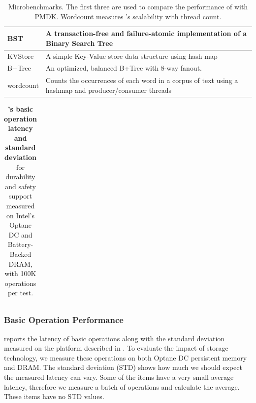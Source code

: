 \begin{table}
      \center
      \footnotesize
    \begin{tabular}{|p{0.5in}|p{2.5in}|}
        \hline
        BST & A transaction-free and failure-atomic implementation of a Binary Search Tree \\ \hline
        KVStore & A simple Key-Value store data structure using hash map \\ \hline
        B+Tree & An optimized, balanced B+Tree with 8-way fanout.  \\ \hline
        wordcount & Counts the occurrences of each word in a corpus of text using a hashmap and producer/consumer threads\\\hline
    \end{tabular}
    \caption{Microbenchmarks. The first three are used to compare the performance of \this{} with PMDK. Wordcount measures \this{}'s scalability with thread count.}
    \label{tab:perf:wrkld}
\end{table}


\begin{table}
  \center
  \footnotesize
  \begin{tabular}{|l||l|l||l|l|}\hline
    
  \end{tabular}
  \caption{\textbf{\This's basic operation latency and standard deviation} for durability and safety support measured on Intel's Optane DC and Battery-Backed DRAM, with 100K operations per test.}
  \label{tab:microbench}
\end{table}

\subsubsection{Basic Operation Performance}

 reports the latency of basic operations along with the standard deviation measured on the platform described in . To evaluate the impact of storage technology, we measure these operations on both Optane DC persistent memory and DRAM. The standard deviation (STD) shows how much we should expect the measured latency can vary. Some of the items have a very small average latency, therefore we measure a batch of operations and calculate the average. These items have no STD values.


